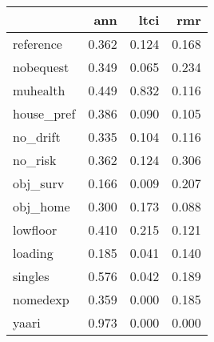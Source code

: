 \begin{tabular}{lrrr}
\toprule
{} &    ann &   ltci &    rmr \\
\midrule
reference  &  0.362 &  0.124 &  0.168 \\
nobequest  &  0.349 &  0.065 &  0.234 \\
muhealth   &  0.449 &  0.832 &  0.116 \\
house\_pref &  0.386 &  0.090 &  0.105 \\
no\_drift   &  0.335 &  0.104 &  0.116 \\
no\_risk    &  0.362 &  0.124 &  0.306 \\
obj\_surv   &  0.166 &  0.009 &  0.207 \\
obj\_home   &  0.300 &  0.173 &  0.088 \\
lowfloor   &  0.410 &  0.215 &  0.121 \\
loading    &  0.185 &  0.041 &  0.140 \\
singles    &  0.576 &  0.042 &  0.189 \\
nomedexp   &  0.359 &  0.000 &  0.185 \\
yaari      &  0.973 &  0.000 &  0.000 \\
\bottomrule
\end{tabular}
